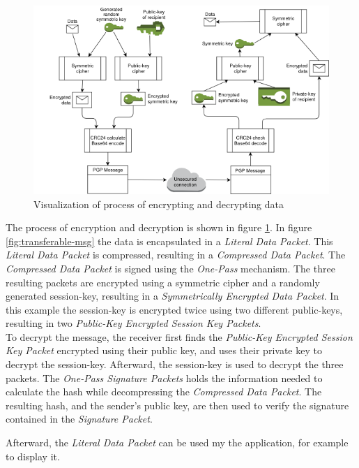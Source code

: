 \begin{figure}[h!]
	\centering
	\includegraphics[width=1\linewidth]{figures/encryption}
	\caption{Visualization of process of encrypting and decrypting data}
	\label{fig:encryption}
\end{figure}


The process of encryption and decryption is shown in figure \ref{fig:encryption}. In figure \ref{fig:transferable-msg} the data is encapsulated in a \textit{Literal Data Packet}. This \textit{Literal Data Packet} is compressed, resulting in a \textit{Compressed Data Packet}. The \textit{Compressed Data Packet} is signed using the \textit{One-Pass} mechanism. The three resulting packets are encrypted using a symmetric cipher and a randomly generated session-key, resulting in a \textit{Symmetrically Encrypted Data Packet}. In this example the session-key is encrypted twice using two different public-keys, resulting in two \textit{Public-Key Encrypted Session Key Packets}. \\


To decrypt the message, the receiver first finds the\textit{ Public-Key Encrypted Session Key Packet} encrypted using their public key, and uses their private key to decrypt the session-key. Afterward, the session-key is used to decrypt the three packets. The \textit{One-Pass Signature Packets} holds the information needed to calculate the hash while decompressing the \textit{Compressed Data Packet}. The resulting hash, and the sender's public key, are then used to verify the signature contained in the \textit{Signature Packet}. 

Afterward, the \textit{Literal Data Packet} can be used my the application, for example to display it.

